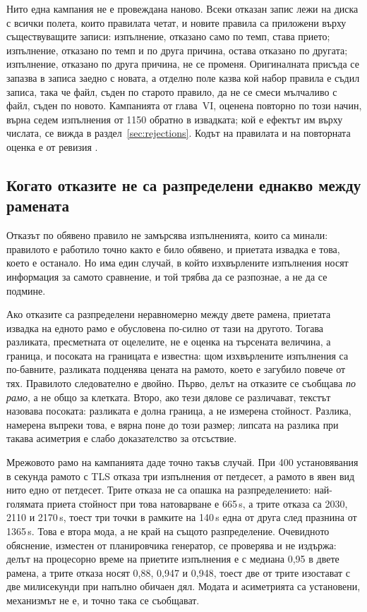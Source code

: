 Нито една кампания не е провеждана наново. Всеки отказан запис лежи на диска с всички полета,
които правилата четат, и новите правила са приложени върху съществуващите записи: изпълнение,
отказано само по темп, става прието; изпълнение, отказано по темп и по друга причина, остава
отказано по другата; изпълнение, отказано по друга причина, не се променя. Оригиналната присъда се
запазва в записа заедно с новата, а отделно поле казва кой набор правила е съдил записа, така че
файл, съден по старото правило, да не се смеси мълчаливо с файл, съден по новото. Кампанията от
глава~VI, оценена повторно по този начин, върна седем изпълнения от 1150 обратно в извадката;
кой е ефектът им върху числата, се вижда в раздел~\ref{sec:rejections}. Кодът на правилата и на
повторната оценка е от ревизия .

\subsection{Когато отказите не са разпределени еднакво между рамената}

Отказът по обявено правило не замърсява изпълненията, които са минали: правилото е работило
точно както е било обявено, и приетата извадка е това, което е останало. Но има един случай, в
който изхвърлените изпълнения носят информация за самото сравнение, и той трябва да се разпознае,
а не да се подмине.

Ако отказите са разпределени неравномерно между двете рамена, приетата извадка на едното рамо е
обусловена по-силно от тази на другото. Тогава разликата, пресметната от оцелелите, не е оценка на
търсената величина, а граница, и посоката на границата е известна: щом изхвърлените изпълнения са
по-бавните, разликата подценява цената на рамото, което е загубило повече от тях. Правилото
следователно е двойно. Първо, делът на отказите се съобщава \emph{по рамо}, а не общо за клетката.
Второ, ако тези дялове се различават, текстът назовава посоката: разликата е долна граница, а не
измерена стойност. Разлика, намерена въпреки това, е вярна поне до този размер; липсата на разлика
при такава асиметрия е слабо доказателство за отсъствие.

Мрежовото рамо на кампанията даде точно такъв случай. При 400 установявания в секунда рамото с TLS
отказа три изпълнения от петдесет, а рамото в явен вид нито едно от петдесет. Трите отказа не са
опашка на разпределението: най-голямата приета стойност при това натоварване е 665\,\textmu s, а
трите отказа са 2030, 2110 и 2170\,\textmu s, тоест три точки в рамките на 140\,\textmu s една от
друга след празнина от 1365\,\textmu s. Това е втора мода, а не край на същото разпределение.
Очевидното обяснение, изместен от планировчика генератор, се проверява и не издържа: делът на
процесорно време на приетите изпълнения е с медиана 0,95 в двете рамена, а трите отказа носят 0,88,
0,947 и 0,948, тоест две от трите изостават с две милисекунди при напълно обичаен дял. Модата и
асиметрията са установени, механизмът не е, и точно така се съобщават.

